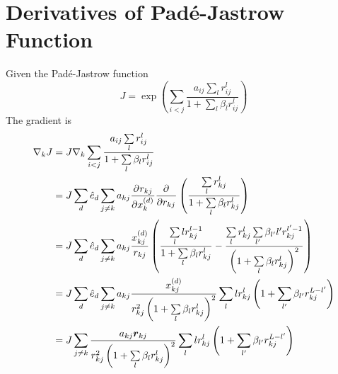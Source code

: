 \section{Derivatives of Pad\'e-Jastrow Function}
    Given the Pad\'e-Jastrow function
        \begin{equation}
            J = \exp\left(\sum\limits_{i<j}\frac{a_{ij}\sum\limits_l
            r^l_{ij}}{1 + \sum\limits_l \beta_l r^l_{ij}}\right)
        \end{equation}
    The gradient is
        \begin{align}
            \nabla_k J &= J \nabla_k \sum\limits_{i<j}\frac{a_{ij}\sum\limits_l
            r^l_{ij}}{1 + \sum\limits_l \beta_l r^l_{ij}} \nonumber \\ &= J
            \sum_d \hat{e}_d \sum_{j\neq k} a_{kj} \prd{x^{(d)}_k}[r_{kj}]
            \prd{r_{kj}} \left(\frac{\sum\limits_l r^l_{kj}}{1 + \sum\limits_l
            \beta_l r^l_{kj}}\right) \nonumber \\
            &= J \sum_d \hat{e}_d \sum_{j\neq k} a_{kj}
            \frac{x^{(d)}_{kj}}{r_{kj}}
            \left(\frac{\sum\limits_llr^{l-1}_{kj}}{1 + \sum\limits_l \beta_l
            r^l_{kj}} - \frac{\sum\limits_l
            r^l_{kj}\sum\limits_{l'}\beta_{l'}l'r^{l'-1}_{kj}}{\left(1 +
            \sum\limits_l\beta_lr^l_{kj}\right)^2}\right) \nonumber \\
            &= J \sum_d \hat{e}_d \sum_{j\neq k}
            a_{kj}\frac{x^{(d)}_{kj}}{r^2_{kj}\left(1 +
            \sum\limits_l\beta_lr^l_{kj}\right)^2} \sum\limits_l lr^l_{kj}
            \left(1 + \sum\limits_{l'}\beta_{l'}r^{L-l'}_{kj}\right) \nonumber
            \\
            &= J \sum_{j\neq k} \frac{a_{kj}\blds{r}_{kj}}{r^2_{kj}\left(1 +
            \sum\limits_l\beta_lr^l_{kj}\right)^2} \sum\limits_l lr^l_{kj}
            \left(1 + \sum\limits_{l'}\beta_{l'}r^{L-l'}_{kj}\right)
        \end{align}
